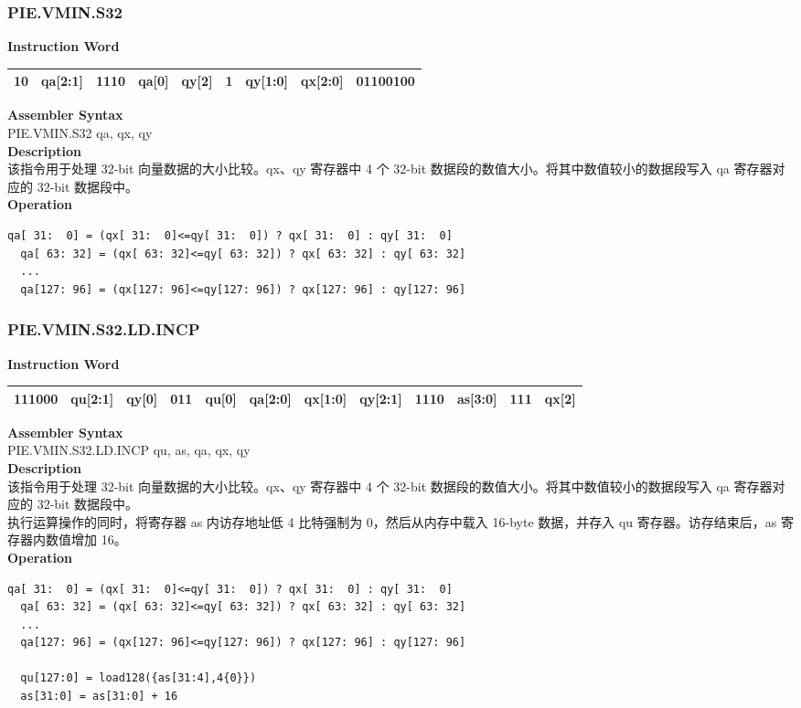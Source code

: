 \newpage
\subsubsection{PIE.VMIN.S32}\label{instruction:PIEVMINS32}
\setlength\tabcolsep{6pt}
\textbf{Instruction Word} \\
\begin{tabular}{|c|c|c|c|c|c|c|c|c|}
	\hline
	10 & qa[2:1] & 1110 & qa[0] & qy[2] & 1 & qy[1:0] & qx[2:0] & 01100100 \\
	\hline
\end{tabular}

\textbf{Assembler Syntax} \\
PIE.VMIN.S32 qa, qx, qy \\
\textbf{Description} \\
该指令用于处理 32-bit 向量数据的大小比较。qx、qy 寄存器中 4 个 32-bit 数据段的数值大小。将其中数值较小的数据段写入 qa 寄存器对应的 32-bit 数据段中。\\
\textbf{Operation}
\begin{lstlisting}[escapeinside=`?]
  qa[ 31:  0] = (qx[ 31:  0]<=qy[ 31:  0]) ? qx[ 31:  0] : qy[ 31:  0]
  qa[ 63: 32] = (qx[ 63: 32]<=qy[ 63: 32]) ? qx[ 63: 32] : qy[ 63: 32]
  ...
  qa[127: 96] = (qx[127: 96]<=qy[127: 96]) ? qx[127: 96] : qy[127: 96]
\end{lstlisting}

\newpage
\subsubsection{PIE.VMIN.S32.LD.INCP}\label{instruction:PIEVMINS32LDINCP}
\setlength\tabcolsep{6pt}
\textbf{Instruction Word} \\
\begin{tabular}{|c|c|c|c|c|c|c|c|c|c|c|c|}
	\hline
	111000 & qu[2:1] & qy[0] & 011 & qu[0] & qa[2:0] & qx[1:0] & qy[2:1] & 1110 & as[3:0] & 111 & qx[2] \\
	\hline
\end{tabular}

\textbf{Assembler Syntax} \\
PIE.VMIN.S32.LD.INCP qu, as, qa, qx, qy \\
\textbf{Description} \\
该指令用于处理 32-bit 向量数据的大小比较。qx、qy 寄存器中 4 个 32-bit 数据段的数值大小。将其中数值较小的数据段写入 qa 寄存器对应的 32-bit 数据段中。\\
执行运算操作的同时，将寄存器 as 内访存地址低 4 比特强制为 0，然后从内存中载入 16-byte 数据，并存入 qu 寄存器。访存结束后，as 寄存器内数值增加 16。\\
\textbf{Operation}
\begin{lstlisting}[escapeinside=`?]
  qa[ 31:  0] = (qx[ 31:  0]<=qy[ 31:  0]) ? qx[ 31:  0] : qy[ 31:  0]
  qa[ 63: 32] = (qx[ 63: 32]<=qy[ 63: 32]) ? qx[ 63: 32] : qy[ 63: 32]
  ...
  qa[127: 96] = (qx[127: 96]<=qy[127: 96]) ? qx[127: 96] : qy[127: 96]

  qu[127:0] = load128({as[31:4],4{0}})
  as[31:0] = as[31:0] + 16
\end{lstlisting}

